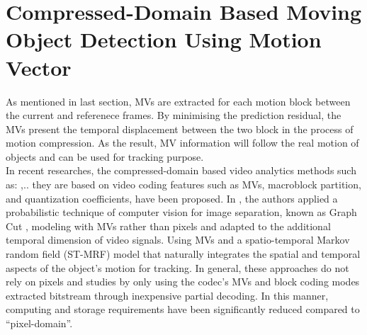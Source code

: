 \section{Compressed-Domain Based Moving Object Detection Using Motion Vector}




 As mentioned in last section, MVs are extracted for each motion block between the current and referenece frames. By minimising the prediction residual, the MVs present the temporal displacement between the two block in the process of motion compression. As the result, MV information will follow the real motion of objects and can be used for tracking purpose.\\
In recent researches, the compressed-domain based video analytics methods such as: \cite{bombardelli2018efficient},\cite{khatoonabadi2012video}.. they are based on video coding features such as MVs, macroblock partition, and quantization coefficients, have been proposed. In \cite{bombardelli2018efficient}, the authors applied a probabilistic technique of computer vision for image separation, known as Graph Cut \cite{boykov2001fast}, modeling with MVs rather than pixels and adapted to the additional temporal dimension of video signals. Using MVs and a spatio-temporal Markov random field (ST-MRF) model that naturally integrates the spatial and temporal aspects of the object’s motion for tracking. In general, these approaches do not rely on pixels and studies by only using the codec’s MVs and block coding modes extracted bitstream through inexpensive partial decoding. In this manner, computing and storage requirements have been significantly reduced compared to “pixel-domain”.\\

